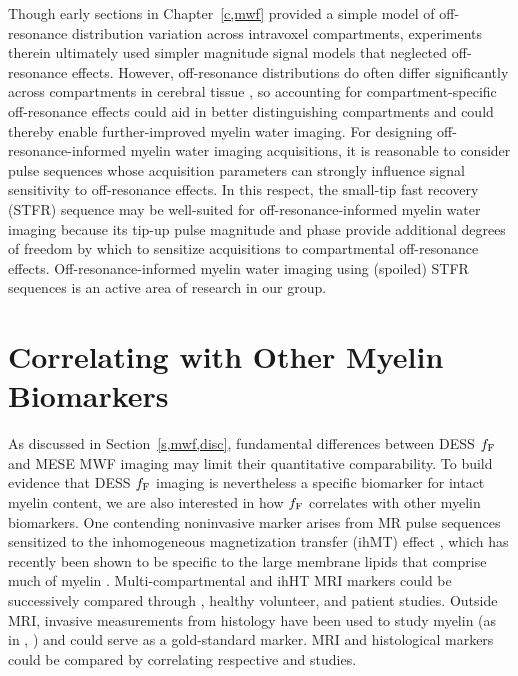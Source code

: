 Though early sections in Chapter~\ref{c,mwf} 
provided a simple model  
of off-resonance distribution variation 
across intravoxel compartments,
experiments therein 
ultimately used simpler magnitude signal models
that neglected off-resonance effects.
However,
off-resonance distributions
do often differ significantly 
across compartments
in cerebral tissue \cite{miller:10:aot-1,miller:10:aot-2},
so accounting for compartment-specific off-resonance effects
could aid in better distinguishing compartments
and could thereby enable further-improved myelin water imaging.
For designing off-resonance-informed myelin water imaging acquisitions,
it is reasonable
to consider pulse sequences
whose acquisition parameters
can strongly influence signal sensitivity 
to off-resonance effects.
In this respect,
the small-tip fast recovery (STFR) sequence \cite{nielsen:13:stf}
may be well-suited for off-resonance-informed myelin water imaging
because its tip-up pulse magnitude and phase
provide additional degrees of freedom
by which to sensitize acquisitions
to compartmental off-resonance effects.
Off-resonance-informed myelin water imaging
using (spoiled) STFR sequences
is an active area of research 
in our group.

\section{Correlating with Other Myelin Biomarkers}
\label{s,future,myelin}

As discussed in Section~\ref{s,mwf,disc},
fundamental differences 
between DESS $f_{\mathrm{F}}$ and MESE MWF imaging
may limit their quantitative comparability.
To build evidence 
that DESS $f_{\mathrm{F}}$ imaging
is nevertheless a specific biomarker
for intact myelin content,
we are also interested 
in how $f_{\mathrm{F}}$ correlates 
with other myelin biomarkers.
One contending noninvasive marker arises
from MR pulse sequences sensitized
to the inhomogeneous magnetization transfer (ihMT) effect
\cite{varma:15:mtf},
which has recently been shown
to be specific
to the large membrane lipids
that comprise much of myelin
\cite{varma:15:iom, swanson:17:mda}.
Multi-compartmental and ihHT MRI markers 
could be successively compared 
through \exvivo, healthy volunteer, and patient studies.
Outside MRI,
invasive measurements
from histology
have been used to study myelin 
(as in \eg, \cite{gareau:00:mta, webb:03:imt})
and could serve as a gold-standard \insitu marker.
MRI and histological markers
could be compared 
by correlating respective \exvivo and \insitu studies.

